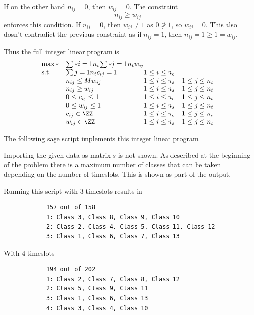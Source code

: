 \documentclass[11pt, oneside]{article}
\begin{document}
\begin{enumerate}
        If on the other hand $n_{ij} = 0$, then $w_{ij} = 0$.
        The constraint
        \[
            n_{ij} \ge w_{ij}
        \]
        enforces this condition.
        If $n_{ij} = 0$, then $w_{ij} \neq 1$ as $0 \ngeq 1$, so $w_{ij} = 0$.
        This also dosn't contradict the previous constraint as if $n_{ij} = 1$,
        then $n_{ij} = 1 \ge 1 = w_{ij}$.

        Thus the full integer linear program is
        \[
            \begin{array}{ll@{}ll}
                \max* & \sum*{i = 1}{n_s}{\sum*{j=1}{n_t}{w_{ij}}} \\
                \text{s.t.} & \sum{j=1}{n_t}{c_{ij}} = 1 \hskip 1em &1 \le i \le n_c \\
                            & n_{ij} \le M w_{ij}         &1 \le i \le n_s \hskip 1em 1 \le j \le n_t\\
                            & n_{ij} \ge w_{ij}           &1 \le i \le n_s \hskip 1em 1 \le j \le n_t \\
                            & 0 \le c_{ij} \le 1          &1 \le i \le n_c \hskip 1em 1 \le j \le n_t \\
                            & 0 \le w_{ij} \le 1          &1 \le i \le n_s \hskip 1em 1 \le j \le n_t \\
                            & c_{ij} \in \ZZ              &1 \le i \le n_c \hskip 1em 1 \le j \le n_t \\
                            & w_{ij} \in \ZZ              &1 \le i \le n_s \hskip 1em 1 \le j \le n_t
            \end{array}
        \]

        The following sage script implements this integer linear program.
        
        Importing the given data as matrix $s$ is not shown.
        As described at the beginning of the problem there is a maximum number
        of classes that can be taken depending on the number of timeslots.
        This is shown as part of the output.

        Running this script with 3 timeslots results in
        \begin{verbatim}
            157 out of 158
            1: Class 3, Class 8, Class 9, Class 10
            2: Class 2, Class 4, Class 5, Class 11, Class 12
            3: Class 1, Class 6, Class 7, Class 13           
        \end{verbatim}

        With 4 timeslots
        \begin{verbatim}
            194 out of 202
            1: Class 2, Class 7, Class 8, Class 12
            2: Class 5, Class 9, Class 11
            3: Class 1, Class 6, Class 13
            4: Class 3, Class 4, Class 10
        \end{verbatim}

\end{enumerate}
\end{document}
